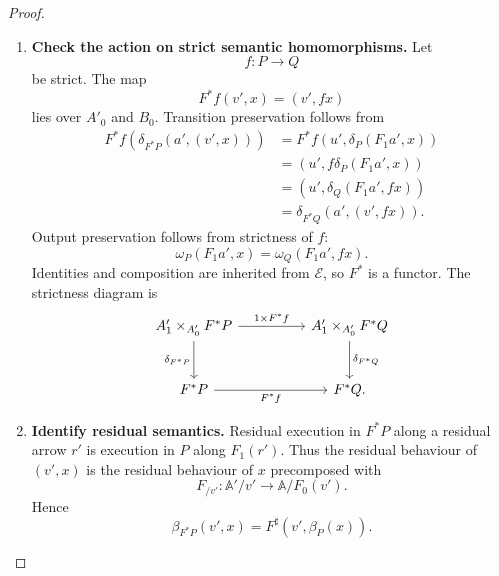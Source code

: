 \begin{proof}
\begin{enumerate}
        \item \textbf{Check the action on strict semantic homomorphisms.}
        Let
        \[
            f:P\to Q
        \]
        be strict. The map
        \[
            F^*f(v',x)=(v',fx)
        \]
        lies over \(A'_0\) and \(B_0\). Transition preservation follows from
        \[
        \begin{aligned}
            F^*f(\delta_{F^*P}(a',(v',x)))
            &=
            F^*f(u',\delta_P(F_1a',x)) \\
            &=
            (u',f\delta_P(F_1a',x)) \\
            &=
            (u',\delta_Q(F_1a',fx)) \\
            &=
            \delta_{F^*Q}(a',(v',fx)).
        \end{aligned}
        \]
        Output preservation follows from strictness of \(f\):
        \[
            \omega_P(F_1a',x)=\omega_Q(F_1a',fx).
        \]
        Identities and composition are inherited from \(\mathcal E\), so
        \(F^*\) is a functor. The strictness diagram is
        \[
        \begin{tikzcd}[column sep=huge, row sep=large]
            A'_1\times_{A'_0}F^*P
                \arrow[r, "{1\times F^*f}"]
                \arrow[d, "\delta_{F^*P}"']
            &
            A'_1\times_{A'_0}F^*Q
                \arrow[d, "\delta_{F^*Q}"]
            \\
            F^*P
                \arrow[r, "F^*f"']
            &
            F^*Q .
        \end{tikzcd}
        \]

        \item \textbf{Identify residual semantics.}
        Residual execution in \(F^*P\) along a residual arrow \(r'\) is
        execution in \(P\) along \(F_1(r')\). Thus the residual behaviour of
        \((v',x)\) is the residual behaviour of \(x\) precomposed with
        \[
            F_{/v'}:\mathbb A'/v'\to\mathbb A/F_0(v').
        \]
        Hence
        \[
            \beta_{F^*P}(v',x)
            =
            F^\sharp(v',\beta_P(x)).
        \]


\end{enumerate}
\end{proof}
